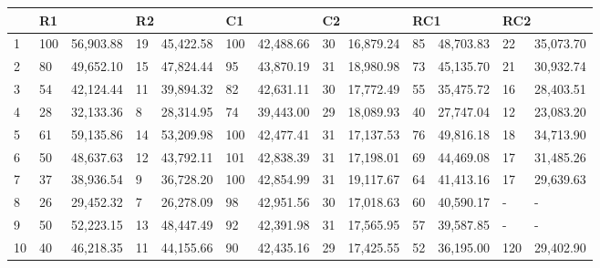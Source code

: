 \begin{table}[caption={Best Results, 1,000 Locations}, label=tab:2]
    \begin{tabular}{lllllllllllll}
        \toprule
        & \multicolumn{2}{l}{R1} & \multicolumn{2}{l}{R2} & \multicolumn{2}{l}{C1} & \multicolumn{2}{l}{C2} & \multicolumn{2}{l}{RC1} & \multicolumn{2}{l}{RC2} \\
        \midrule
        1  & 100 & 56,903.88 & 19 & 45,422.58 & 100 & 42,488.66 & 30 & 16,879.24 & 85 & 48,703.83 & 22  & 35,073.70 \\
        2  & 80  & 49,652.10 & 15 & 47,824.44 & 95  & 43,870.19 & 31 & 18,980.98 & 73 & 45,135.70 & 21  & 30,932.74 \\
        3  & 54  & 42,124.44 & 11 & 39,894.32 & 82  & 42,631.11 & 30 & 17,772.49 & 55 & 35,475.72 & 16  & 28,403.51 \\
        4  & 28  & 32,133.36 & 8  & 28,314.95 & 74  & 39,443.00 & 29 & 18,089.93 & 40 & 27,747.04 & 12  & 23,083.20 \\
        5  & 61  & 59,135.86 & 14 & 53,209.98 & 100 & 42,477.41 & 31 & 17,137.53 & 76 & 49,816.18 & 18  & 34,713.90 \\
        6  & 50  & 48,637.63 & 12 & 43,792.11 & 101 & 42,838.39 & 31 & 17,198.01 & 69 & 44,469.08 & 17  & 31,485.26 \\
        7  & 37  & 38,936.54 & 9  & 36,728.20 & 100 & 42,854.99 & 31 & 19,117.67 & 64 & 41,413.16 & 17  & 29,639.63 \\
        8  & 26  & 29,452.32 & 7  & 26,278.09 & 98  & 42,951.56 & 30 & 17,018.63 & 60 & 40,590.17 & -   & -         \\
        9  & 50  & 52,223.15 & 13 & 48,447.49 & 92  & 42,391.98 & 31 & 17,565.95 & 57 & 39,587.85 & -   & -         \\
        10 & 40  & 46,218.35 & 11 & 44,155.66 & 90  & 42,435.16 & 29 & 17,425.55 & 52 & 36,195.00 & 120 & 29,402.90  \\
    \end{tabular} \\
\end{table}